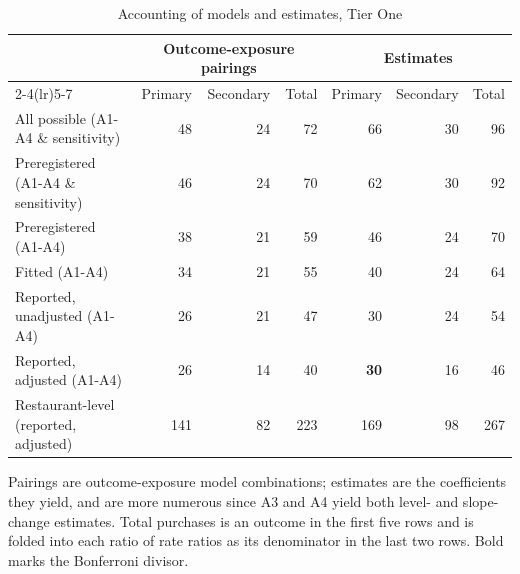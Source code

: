 \begin{table}[H]
\centering
\caption{Accounting of models and estimates, Tier One}
\label{tab:estimate_accounting_t1}
\begin{tabular}{lrrrrrr}
\toprule
 & \multicolumn{3}{c}{Outcome-exposure pairings} & \multicolumn{3}{c}{Estimates} \\
\cmidrule(lr){2-4}\cmidrule(lr){5-7}
 & Primary & Secondary & Total & Primary & Secondary & Total \\
\midrule
All possible (A1-A4 \& sensitivity) & 48 & 24 & 72 & 66 & 30 & 96 \\
Preregistered (A1-A4 \& sensitivity) & 46 & 24 & 70 & 62 & 30 & 92 \\
Preregistered (A1-A4) & 38 & 21 & 59 & 46 & 24 & 70 \\
Fitted (A1-A4) & 34 & 21 & 55 & 40 & 24 & 64 \\
Reported, unadjusted (A1-A4) & 26 & 21 & 47 & 30 & 24 & 54 \\
Reported, adjusted (A1-A4) & 26 & 14 & 40 & \textbf{30} & 16 & 46 \\
Restaurant-level (reported, adjusted) & 141 &  82 & 223 & 169 &  98 & 267 \\
\bottomrule
\end{tabular}
\par\smallskip\footnotesize Pairings are outcome-exposure model combinations; estimates are the coefficients they yield, and are more numerous since A3 and A4 yield both level- and slope-change estimates. Total purchases is an outcome in the first five rows and is folded into each ratio of rate ratios as its denominator in the last two rows. Bold marks the Bonferroni divisor.
\end{table}
